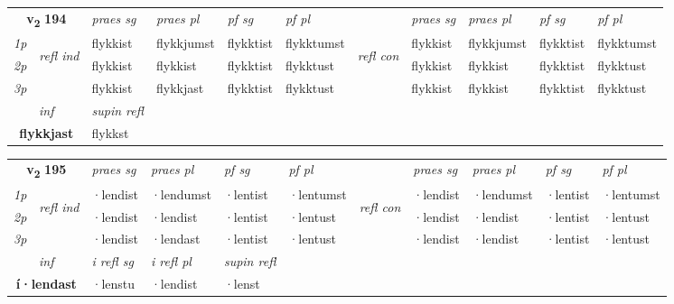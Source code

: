 \noindent
\begin{tabular}{lllllllllll} \toprule
\multicolumn{2}{c}{\textbf{v{\textsubscript{2}}} \Large{\textbf{194}}}  &  \textit{praes sg}  & \textit{praes pl}  &\textit{ pf sg} & \textit{pf pl} &  &  \textit{praes sg}  & \textit{praes pl}  & \textit{pf sg} & \textit{pf pl } \\*
	\cmidrule{3-6} \cmidrule{8-11}
 {\textit{1p}} & \multirow{3}{*}{\begin{turn}{90}\textit{refl ind}\end{turn}}  & flykkist & flykkjumst & flykktist & flykktumst & \multirow{3}{*}{\begin{turn}{90}\textit{refl con}\end{turn}}  &flykkist & flykkjumst & flykktist & flykktumst \\*
 {\textit{2p}} &  & flykkist & flykkist & flykktist & flykktust & &flykkist & flykkist & flykktist & flykktust \\*
 {\textit{3p}}  & & flykkist & flykkjast & flykktist & flykktust & & flykkist & flykkist& flykktist & flykktust \\*
\cmidrule{3-6} \cmidrule{8-11}

   \multicolumn{2}{c}{\textit{inf}}       & \textit{supin refl}  \\*
  \multicolumn{2}{c}{\textbf{flykkjast}}        & flykkst  \\*
\end{tabular}

\noindent
\begin{tabular}{lllllllllll} \toprule
\multicolumn{2}{c}{\textbf{v{\textsubscript{2}}} \Large{\textbf{195}}}  &  \textit{praes sg}  & \textit{praes pl}  &\textit{ pf sg} & \textit{pf pl} &  &  \textit{praes sg}  & \textit{praes pl}  & \textit{pf sg} & \textit{pf pl } \\*
	\cmidrule{3-6} \cmidrule{8-11}
 {\textit{1p}} & \multirow{3}{*}{\begin{turn}{90}\textit{refl ind}\end{turn}}  & ·lendist & ·lendumst & ·lentist & ·lentumst & \multirow{3}{*}{\begin{turn}{90}\textit{refl con}\end{turn}}  &·lendist & ·lendumst & ·lentist & ·lentumst \\*
 {\textit{2p}} &  & ·lendist & ·lendist & ·lentist & ·lentust & &·lendist & ·lendist & ·lentist & ·lentust \\*
 {\textit{3p}}  & & ·lendist & ·lendast & ·lentist & ·lentust & & ·lendist & ·lendist& ·lentist & ·lentust \\*
\cmidrule{3-6} \cmidrule{8-11}

   \multicolumn{2}{c}{\textit{inf}}   & \textit{i refl sg} & \textit{i refl pl}   & \textit{supin refl}  \\*
  \multicolumn{2}{c}{\textbf{í\allowbreak ·lendast}}    & ·lenstu & ·lendist   & ·lenst  \\*
\end{tabular}

